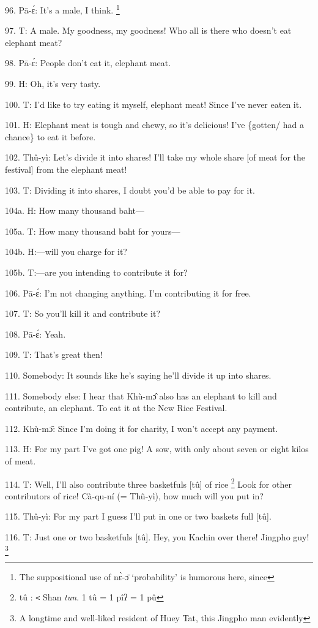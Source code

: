 96. Pā-ɛ́: It's a male, I think. \footnote{The suppositional use of nɛ̀-ɔ̄ `probability' is humorous here, since}

97. T: A male.  My goodness, my goodness!  Who all is there who doesn't eat elephant
meat?

98. Pā-ɛ́: People don't eat it, elephant meat.

99. H: Oh, it's very tasty.

100. T: I'd like to try eating it myself, elephant meat!  Since I've never eaten
it.

101. H: Elephant meat is tough and chewy, so it's delicious!  I've \{gotten/ had
a chance\} to eat it before.

102. Thû-yì: Let's divide it into shares!  I'll take my whole share [of meat
for the festival] from the elephant meat!

103. T: Dividing it into shares, I doubt you'd be able to pay for it.

104a. H: How many thousand baht---

105a. T: How many thousand baht for yours---

104b. H:---will you charge for it?

105b. T:---are you intending to contribute it for?

106. Pā-ɛ́: I'm not changing anything.  I'm contributing it for free.

107. T: So you'll kill it and contribute it?

108. Pā-ɛ́: Yeah.

109. T: That's great then!

110. Somebody: It sounds like he's saying he'll divide it up into shares.

111. Somebody else: I hear that Khù-mɔ̂ also has an elephant to kill and contribute,
an elephant.  To eat it at the New Rice Festival.

112. Khù-mɔ̂: Since I'm doing it for charity, I won't accept any payment.

113. H: For my part I've got one pig!  A sow, with only about seven or eight kilos
of meat.

114. T: Well, I'll also contribute three basketfuls [tû] of rice \.\footnote{tû : \texttt{<} Shan \textit{tun}.  1 tû = 1 pîʔ = 1 pû}  Look for
other contributors of rice!  Cà-qu-ní (= Thû-yì), how much will you put in?

115. Thû-yì: For my part I guess I'll put in one or two baskets full [tû].

116. T: Just one or two basketfuls [tû].  Hey, you Kachin over there!  Jingpho
guy! \footnote{A longtime and well-liked resident of Huey Tat, this Jingpho man evidently}

